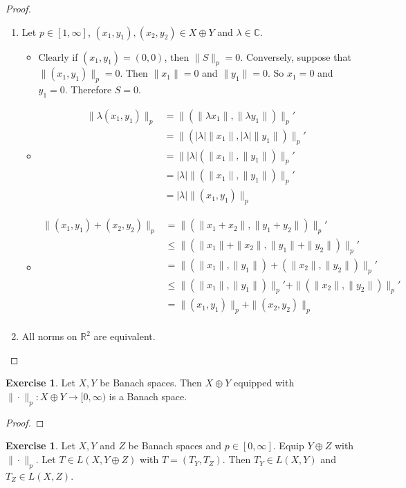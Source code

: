 \documentclass[12pt]{amsart}
\theoremstyle{definition}
\newtheorem{ex}[definition]{Exercise}
\newcommand{\lam}{\lambda}
\newcommand{\C}{\mathbb{C}}
\newcommand{\R}{\mathbb{R}}
\DeclareMathOperator*{\0}{\mbf{0}}
\DeclareMathOperator*{\1}{\mbf{1}}
\newcommand{\lex}[1]{\label{ex:#1}}
\begin{document}
	\begin{proof}\
	\begin{enumerate}
	\item Let $p \in [1, \infty]$, $(x_1,y_1), (x_2,y_2) \in X \oplus Y$ and $\lam \in \C$.
	\begin{itemize}
	\item Clearly if $(x_1, y_1) = (0,0)$, then $\|S\|_p = 0$. Conversely, suppose that $\|(x_1, y_1)\|_p = 0$. Then $\|x_1\| = 0$ and $\|y_1\| = 0$. So $x_1 = 0$ and $y_1 = 0$. Therefore $S = 0$. 
	\item 
	\begin{align*}
	\|\lam (x_1, y_1)\|_p
	&= \|(\|\lam x_1\|, \|\lam y_1\|)\|_p' \\
	&= \|(|\lam|\| x_1\|, |\lam|\|y_1 \|)\|_p' \\
	&= \||\lam| (\| x_1\|,\|y_1\| )\|_p' \\
	&= |\lam| \|(\| x_1\|,\|y_1\|)\|_p' \\
	&= |\lam| \| (x_1, y_1)\|_p
	\end{align*}
	\item 
	\begin{align*}
	\|(x_1, y_1) + (x_2, y_2)\|_p
	&= \|(\|x_1 + x_2\|, \|y_1 + y_2\|)\|_p' \\
	&\leq \|(\|x_1\| + \|x_2\|, \|y_1\| + \|y_2\|)\|_p' \\
	&= \|(\|x_1\|, \|y_1\|) + (\|x_2\|, \|y_2\|)\|_p' \\
	&\leq \|(\|x_1\|, \|y_1\|)\|_p' + \|(\|x_2\|, \|y_2\|)\|_p' \\
	&= \|(x_1, y_1)\|_p + \|(x_2, y_2)\|_p \\ 
	\end{align*}
	\end{itemize}
	\item All norms on $\R^2$ are equivalent.
	\end{enumerate}
\end{proof}		

\begin{ex} \lex{}	
	Let $X, Y$ be Banach spaces. Then $X \oplus Y$ equipped with $\|\cdot \|_p:X \oplus Y \rightarrow [0, \infty)$ is a Banach space. 
	\end{ex}
	
	\begin{proof}
	
	\end{proof}
	
	\begin{ex}
	Let $X, Y$ and $Z$ be Banach spaces and $p \in [0, \infty]$. Equip $Y \oplus Z$ with $\|\cdot\|_p$. Let $T \in L(X, Y \oplus Z)$ with $T = (T_Y, T_Z)$. Then $T_Y \in L(X, Y)$ and $T_Z \in L(X, Z)$.
	\end{ex}
	
\end{document}
